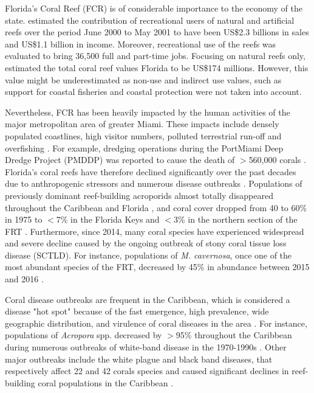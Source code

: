 Florida's Coral Reef (FCR) is of considerable importance to the economy of the state. \cite{johns2003socio} estimated the contribution of recreational users of natural and artificial reefs over the period June 2000 to May 2001 to have been US\$2.3 billions in sales and US\$1.1 billion in income. Moreover, recreational use of the reefs was evaluated to bring 36,500 full and part-time jobs. Focusing on natural reefs only, \cite{brander2013total} estimated the total coral reef values Florida to be US\$174 millions. However, this value might be underestimated as non-use and indirect use values, such as support for coastal fisheries \citep{ault2006building} and coastal protection \citep{ferrario2014effectiveness} were not taken into account.

Nevertheless, FCR has been heavily impacted by the human activities of the major metropolitan area of greater Miami. These impacts include densely populated coastlines, high visitor numbers, polluted terrestrial run-off and overfishing \citep{jackson2014status}. For example, dredging operations during the PortMiami Deep Dredge Project (PMDDP) was reported to cause the death of $>$560,000 corals \citep{cunning2019extensive}. Florida's coral reefs have therefore declined significantly over the past decades due to anthropogenic stressors and numerous disease outbreaks \citep{gardner2003long, jackson2014status}. Populations of previously dominant reef-building acroporids almost totally disappeared throughout the Caribbean and Florida \citep{aronson2001white}, and coral cover dropped from 40 to 60\% in 1975 to $<$7\% in the Florida Keys \citep{jackson2014status} and $<$3\% in the northern section of the FRT \citep{walton2018impacts}. Furthermore, since 2014, many coral species have experienced widespread and severe decline caused by the ongoing outbreak of stony coral tissue loss disease (SCTLD). For instance, populations of \textit{M. cavernosa}, once one of the most abundant species of the FRT, decreased by 45\% in abundance between 2015 and 2016 \citep{walton2018impacts}.

Coral disease outbreaks are frequent in the Caribbean, which is considered a disease "hot spot" because of the fast emergence, high prevalence, wide geographic distribution, and virulence of coral diseases in the area \citep{green2000significance, harvell2007coral}. For instance, populations of  \textit{Acropora} spp. decreased by $>$95\% throughout the Caribbean during numerous outbreaks of white-band disease in the 1970-1990s \citep{aronson2001white}. Other major outbreaks include the white plague and black band diseases, that respectively affect 22 and 42 corals species and caused significant declines in reef-building coral populations in the Caribbean \citep{bruckner2003field,miller2009coral, muller2011black}. 

